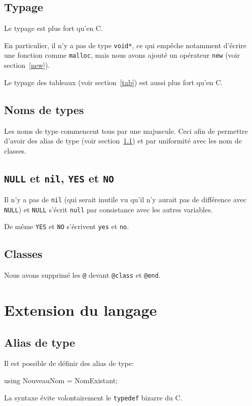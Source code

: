 \documentclass{scrartcl}
\begin{document}
  \subsection{Typage}
    Le typage est plus fort qu'en C.

    En particulier, il n'y a pas de type \verb+void*+, ce qui empêche notamment
    d'écrire une fonction comme \verb+malloc+, mais nous avons ajouté un
    opérateur \verb+new+ (voir section~\ref{new}).

    Le typage des tableaux (voir section~\ref{tab}) est aussi plus fort qu'en C.

  \subsection{Noms de types}
    Les noms de type commencent tous par une majuscule. Ceci afin de permettre
    d'avoir des alias de type (voir section~\ref{alias}) et par uniformité avec
    les nom de classes.

  \subsection{\texttt{NULL} et \texttt{nil}, \texttt{YES} et \texttt{NO}}
    Il n'y a pas de \verb+nil+ (qui serait inutile vu qu'il n'y aurait pas de
    différence avec \verb+NULL+) et \verb+NULL+ s'écrit \verb+null+ par
    consistance avec les autres variables.

    De même \verb+YES+ et \verb+NO+ s'écrivent \verb+yes+ et \verb+no+.

  \subsection{Classes}
    Nous avons supprimé les \verb+@+ devant \verb+@class+ et \verb+@end+.

\section{Extension du langage}
  \subsection{Alias de type}\label{alias}
    Il est possible de définir des alias de type:
    \begin{moccode}
using NouveauNom = NomExistant;
    \end{moccode}

    La syntaxe évite volontairement le \verb+typedef+ bizarre du C.
\end{document}
